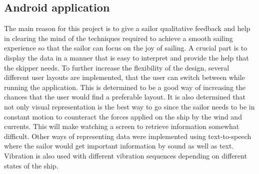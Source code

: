 \subsection{Android application}
The main reason for this project is to give a sailor qualitative feedback and help in clearing the mind of the techniques required to achieve a smooth sailing experience so that the sailor can focus on the joy of sailing. A crucial part is to display the data in a manner that is easy to interpret and provide the help that the skipper needs. To further increase the flexibility of the design, several different user layouts are implemented, that the user can switch between while running the application. This is determined to be a good way of increasing the chances that the user would find a preferable layout. It is also determined that not only visual representation is the best way to go since the sailor needs to be in constant motion to counteract the forces applied on the ship by the wind and currents. This will make watching a screen to retrieve information somewhat difficult. Other ways of representing data were implemented using text-to-speech where the sailor would get important information by sound as well as text. Vibration is also used with different vibration sequences depending on different states of the ship.


